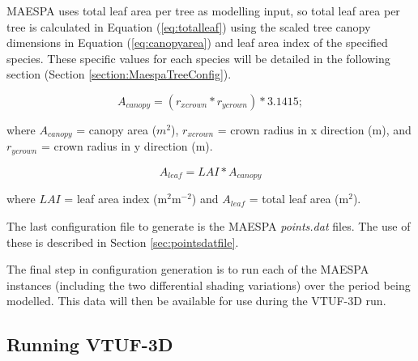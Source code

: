 \documentclass[preprint,12pt,authoryear]{elsarticle}
\begin{document}

MAESPA uses total leaf area per tree as modelling input, so total leaf area per tree is calculated in  Equation (\ref{eq:totalleaf}) using the scaled tree canopy dimensions in Equation (\ref{eq:canopyarea}) and leaf area index of the specified species. These specific values for each species will be detailed in the following section (Section \ref{section:MaespaTreeConfig}).

\begin{equation} A _{canopy} = (r _{xcrown} * r _{ycrown}) * 3.1415 ;
\label{eq:canopyarea} 
\end{equation} 

where $A _{canopy}$ = canopy area ($m^{2}$), $r _{xcrown}$ = crown radius in x direction (m), and $r _{ycrown}$ = crown radius in y direction (m).

\begin{equation} A_{leaf} = LAI * A _{canopy}
\label{eq:totalleaf} 
\end{equation} 

where $LAI$ = leaf area index (m$^{2}$m$^{-2}$) and $A_{leaf}$ = total leaf area (m$^{2}$).




The last configuration file to generate is the MAESPA \textit{points.dat} files. The use of these is described in Section \ref{sec:pointsdatfile}.

The final step in configuration generation is to run each of the MAESPA instances (including the two differential shading variations) over the period being modelled. This data will then be available for use during the VTUF-3D run.

\subsection{Running VTUF-3D}\label{section:modelRun}


%
\end{document}
